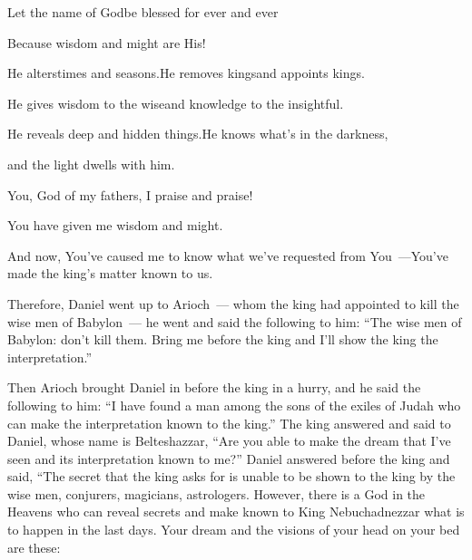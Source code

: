\begin{inparaenum}
  \pb{}Let the name of God\pa{}be blessed for ever and ever%

  \pb{}Because wisdom and might are His!%

  \pa{} He alters\pa{}times and seasons.\pa{}He removes kings\pa{}and appoints kings.%

  \pb{}He gives wisdom to the wise\pa{}and knowledge to the insightful.%

  \pa{} He reveals deep%
  and hidden things.\pa{}He knows what's in the darkness,%

  \pb{}and the light dwells with him.%

  \pa{} You, God of my fathers, I praise%
  and praise!%

  \pb{}You have given me wisdom and might.%

  \pb{}And now, You've caused me to know what we've requested from You~---\pa{}You've made the king's matter known to us.\smallskip%

  \noindent{} Therefore, Daniel went up to Arioch~--- whom the king had appointed to kill the wise men of Babylon~--- he went and said the following to him: ``The wise men of Babylon: don't kill them. Bring me before the king and I'll show the king the interpretation.''%

   Then Arioch brought Daniel in before the king in a hurry, and he said the following to him: ``I have found a man among the sons of the exiles of Judah who can make the interpretation known to the king.''%
   The king answered and said to Daniel, whose name is Belteshazzar, ``Are you able to make the dream that I've seen and its interpretation known to me?''%
   Daniel answered before the king and said, ``The secret that the king asks for is unable to be shown to the king by the wise men, conjurers, magicians, astrologers.%
   However, there is a God in the Heavens who can reveal secrets and make known to King Nebuchadnezzar what is to happen in the last days. Your dream and the visions of your head on your bed are these:%


\end{inparaenum}
